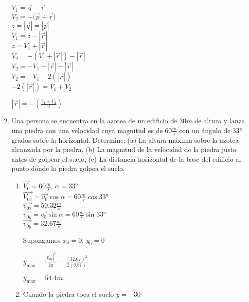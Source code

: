 \documentclass[10pt, a4paper]{article}
\begin{document}
\begin{enumerate}
        \begin{center}
            $V_1= \vec{q} -\vec{r}$\\
            $V_2= -(\vec{p} + \vec{r}$)\\
            $z = |\vec{q}| = |\vec{p}|$\\
            $V_1 = z - |\vec{r}|$\\
            $z = V_1 + |\vec{r}|$\\
            $V_2 = -(V_1 + |\vec{r}|) - |\vec{r}|$\\
            $V_2 = -V_1 - |\vec{r}| - |\vec{r}|$\\
            $V_2 = -V_1 - 2(|\vec{r}|)$\\
            $- 2(|\vec{r}|)= V_1 + V_2$

            $|\vec{r}|= -(\frac{V_1 + V_2}{2})$
        \end{center}
    \item Una persona se encuentra en la azotea de un edificio de $30 \si{m}$ de altura y lanza
    una piedra con una velocidad cuya magnitud es de $60 \si{\frac{m}{s}}$ con un ángulo de $\ang{33}$
    grados sobre la horizontal. Determine: (a) La altura máxima sobre la azotea
    alcanzada por la piedra, (b) La magnitud de la velocidad de la piedra justo antes
    de golpear el suelo, (c) La distancia horizontal de la base del edificio al punto
    donde la piedra golpea el suelo.

    \begin{enumerate}     
        \item    
        \begin{center}
            $\vec{V_0}= 60 \si{\frac{m}{s}}$, $\alpha = \ang{33}$\\
            $\vec{V_{0x}}= \vec{v_0} \cos{\alpha}= 60 \si{\frac{m}{s}} \cos{\ang{33}}$\\
            $\vec{v_{0x}}= 50.32 \si{\frac{m}{s}}$\\
            $\vec{v_{0y}}= \vec{v_0} \sin{\alpha} = 60 \si{\frac{m}{s}} \sin{\ang{33}}$\\
            $\vec{v_{0y}}= 32.67\si{\frac{m}{s}}$

            Supongamos $x_0=0$, $y_0=0$

            $y_{\text{max}}=\frac{|\vec{v_{0y}}|^2}{2g}=\frac{(32.67)^2}{2(9.81)}$

            $y_{\text{max}}=54.4 \si{m}$
        \end{center}
        \item 
        \begin{center}
            Cuando la piedra toca el suelo $y = -30$


\end{center}
\end{enumerate}
\end{enumerate}
\end{document}
